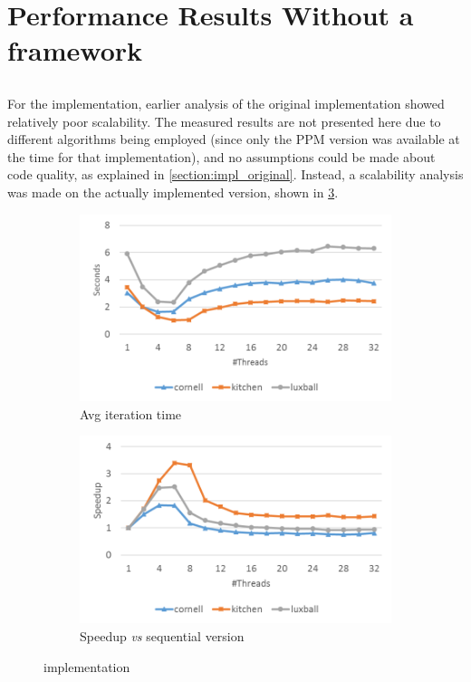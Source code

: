 \documentclass[main.tex]{subfiles}
\begin{document}
\section{Performance Results Without a framework} \label{sec:prof:cpu}

\subsection{\cpu}

For the \cpu implementation, earlier analysis of the original implementation showed relatively poor scalability. The measured results are not presented here due to different algorithms being employed (since only the PPM version was available at the time for that implementation), and no assumptions could be made about code quality, as explained in \cref{section:impl_original}.
Instead, a scalability analysis was made on the actually implemented \cpu version, shown in \cref{fig:prof:cpu}.

\begin{figure}[!htp]
  \centering
  \begin{subfigure}{.5\textwidth}
    \centering
    \includegraphics[width=\linewidth]{profiling/cpu_time}
    \caption{Avg iteration time \label{fig:prof:cpu_time}}
  \end{subfigure}%
  \begin{subfigure}{.5\textwidth}
    \centering
    \includegraphics[width=\linewidth]{profiling/cpu_speedup}
    \caption{Speedup \textit{vs} sequential version \label{fig:prof:cpu_speedup}}
  \end{subfigure}
  \caption{\cpu implementation \label{fig:prof:cpu}}
\end{figure}
\end{document}
